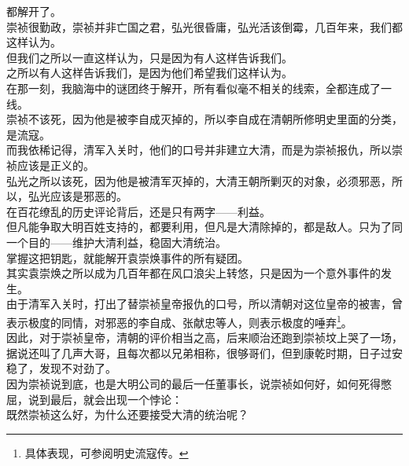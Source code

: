 \begin{multicols}{\theparacolNo}
都解开了。\\

崇祯很勤政，崇祯并非亡国之君，弘光很昏庸，弘光活该倒霉，几百年来，我们都这样认为。\\

但我们之所以一直这样认为，只是因为有人这样告诉我们。\\

之所以有人这样告诉我们，是因为他们希望我们这样认为。\\

在那一刻，我脑海中的谜团终于解开，所有看似毫不相关的线索，全都连成了一线。\\

崇祯不该死，因为他是被李自成灭掉的，所以李自成在清朝所修明史里面的分类，是流寇。\\

而我依稀记得，清军入关时，他们的口号并非建立大清，而是为崇祯报仇，所以崇祯应该是正义的。\\

弘光之所以该死，因为他是被清军灭掉的，大清王朝所剿灭的对象，必须邪恶，所以，弘光应该是邪恶的。\\

在百花缭乱的历史评论背后，还是只有两字——利益。\\

但凡能争取大明百姓支持的，都要利用，但凡是大清除掉的，都是敌人。只为了同一个目的——维护大清利益，稳固大清统治。\\

掌握这把钥匙，就能解开袁崇焕事件的所有疑团。\\

其实袁崇焕之所以成为几百年都在风口浪尖上转悠，只是因为一个意外事件的发生。\\

由于清军入关时，打出了替崇祯皇帝报仇的口号，所以清朝对这位皇帝的被害，曾表示极度的同情，对邪恶的李自成、张献忠等人，则表示极度的唾弃\footnote{具体表现，可参阅明史流寇传。}。\\

因此，对于崇祯皇帝，清朝的评价相当之高，后来顺治还跑到崇祯坟上哭了一场，据说还叫了几声大哥，且每次都以兄弟相称，很够哥们，但到康乾时期，日子过安稳了，发现不对劲了。\\

因为崇祯说到底，也是大明公司的最后一任董事长，说崇祯如何好，如何死得憋屈，说到最后，就会出现一个悖论：\\

既然崇祯这么好，为什么还要接受大清的统治呢？\\


\end{multicols}
